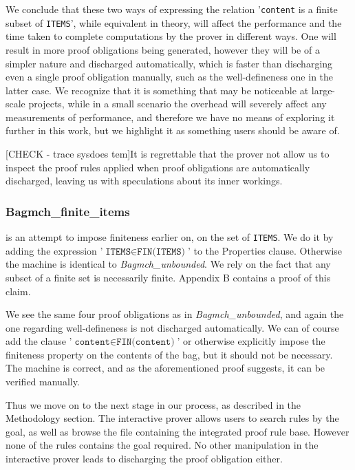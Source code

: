 \documentclass[11pt,journal]{IEEEtran}
\begin{document}
	We conclude that these two ways of expressing the relation '\texttt{content} is a finite subset of \texttt{ITEMS}', while equivalent in theory, will affect the performance and the time taken to complete computations by the prover in different ways. One will result in more proof obligations being generated, however they will be of a simpler nature and discharged automatically, which is faster than discharging even a single proof obligation manually, such as the well-defineness one in the latter case. We recognize that it is something that may be noticeable at large-scale projects, while in a small scenario the overhead will severely affect any measurements of performance, and therefore we have no means of exploring it further in this work, but we highlight it as something users should be aware of.
	
	[CHECK - trace sysdoes tem]It is regrettable that the prover not allow us to inspect the proof rules applied when proof obligations are automatically discharged, leaving us with speculations about its inner workings.
	       
	\subsubsection{Bagmch\_finite\_items} is an attempt to impose finiteness earlier on, on the set of \texttt{ITEMS}. We do it by adding the expression '$\texttt{ITEMS} \in \texttt{FIN(ITEMS)}$' to the Properties clause. Otherwise the machine is identical to \emph{Bagmch\_unbounded}. We rely on the fact that any subset of a finite set is necessarily finite. Appendix B contains a proof of this claim.
	
	We see the same four proof obligations as in \emph{Bagmch\_unbounded}, and again the one regarding well-defineness is not discharged automatically. We can of course add the clause '$\texttt{content} \in \texttt{FIN(content)}$' or otherwise explicitly impose the finiteness property on the contents of the bag, but it should not be necessary. The machine is correct, and as the aforementioned proof suggests, it can be verified manually.
	
	Thus we move on to the next stage in our process, as described in the Methodology section. The interactive prover allows users to search rules by the goal, as well as browse the file containing the integrated proof rule base. However none of the rules contains the goal required. No other manipulation in the interactive prover leads to discharging the proof obligation either.
	
\end{document}
